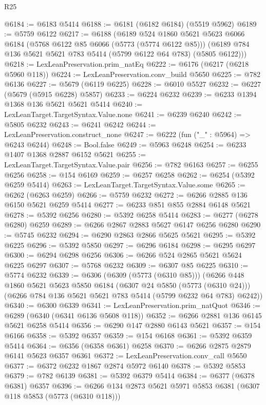 \begin{lexlean}{R25}
\begin{coremodule}
@6184 := @6183 @5414
@6188 := @6181 (@6182 @6184) (@5519 @5962)
@6189 := @5759 @6122
@6217 := @6188
    (@6189
      @524
      @1860
      @5621
      @5623
      @6066
      @6184
      (@5768 @6122 @85 @6066 (@5773 (@5774 @6122 @85)))
      (@6189 @784 @136 @5621 @5621 @783 @5414 (@5799 @6122 @64 @783) (@5805 @6122)))
@6218 := LexLeanPreservation.prim_natEq
@6222 := @6176 (@6217 (@6218 @5960 @118))
@6224 := LexLeanPreservation.conv_build @5650
@6225 := @782 @6136
@6227 := @5679 (@6119 @6225)
@6228 := @6010 @5527
@6232 := @6227 (@5679 (@5915 @6228) @5857)
@6233 := @6224 @6232
@6239 := @6233 @1394 @1368 @136 @5621 @5621 @5414
@6240 := LexLeanTarget.TargetSyntax.Value.none
@6241 := @6239 @6240
@6242 := @5805 @6232
@6243 := @6241 @6242
@6244 := LexLeanPreservation.construct_none
@6247 := @6222 (fun ("_" : @5964) => @6243 @6244)
@6248 := Bool.false
@6249 := @5963 @6248
@6254 := @6233 @1407 @1368 @2887 @6152 @5621
@6255 := LexLeanTarget.TargetSyntax.Value.pair
@6256 := @782 @6163
@6257 := @6255 @6256
@6258 := @154 @6169
@6259 := @6257 @6258
@6262 := @6254 (@5392 @6259 @5414)
@6263 := LexLeanTarget.TargetSyntax.Value.some
@6265 := @6262 (@6263 @6259)
@6266 := @5759 @6232
@6272 := @6266 @2885 @136 @6150 @5621 @6259 @5414
@6277 := @6233 @851 @855 @2884 @6148 @5621
@6278 := @5392 @6256
@6280 := @5392 @6258 @5414
@6283 := @6277 (@6278 @6280) @6259
@6289 := @6266 @2867 @2883 @5627 @6147 @6256 @6280
@6290 := @5745 @6232
@6294 := @6290 @2863 @2866 @5625 @5621
@6295 := @5392 @6225
@6296 := @5392 @5850
@6297 := @6296 @6184
@6298 := @6295 @6297
@6300 := @6294 @6298 @6256
@6306 := @6266 @524 @2865 @5621 @5624 @6225 @6297
@6307 := @5768 @6232
@6309 := @6307 @85 @6225
@6310 := @5774 @6232
@6339 := @6306
    (@6309 (@5773 (@6310 @85)))
    (@6266
      @448
      @1860
      @5621
      @5623
      @5850
      @6184
      (@6307 @24 @5850 (@5773 (@6310 @24)))
      (@6266 @784 @136 @5621 @5621 @783 @5414 (@5799 @6232 @64 @783) @6242))
@6340 := @6300 @6339
@6341 := LexLeanPreservation.prim_natQuot
@6346 := @6289 (@6340 (@6341 @6136 @5608 @118))
@6352 := @6266 @2881 @136 @6145 @5621 @6258 @5414
@6356 := @6290 @147 @2880 @6143 @5621
@6357 := @154 @6166
@6358 := @5392 @6357
@6359 := @154 @6168
@6361 := @5392 @6359 @5414
@6364 := @6356 (@6358 @6361) @6258
@6370 := @6266 @2875 @2879 @6141 @5623 @6357 @6361
@6372 := LexLeanPreservation.conv_call @5650
@6377 := @6372 @6232 @1867 @2874 @5972 @6140
@6378 := @5392 @5853
@6379 := @782 @6139
@6381 := @5392 @6379 @5414
@6384 := @6377 (@6378 @6381) @6357
@6396 := @6266 @134 @2873 @5621 @5971 @5853 @6381 (@6307 @118 @5853 (@5773 (@6310 @118)))

\end{coremodule}
\end{lexlean}
